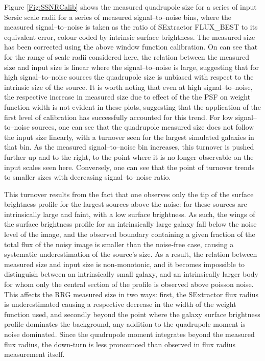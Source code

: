 \documentclass[useAMS,usenatbib,times,letter,amssymb]{mn2e}
\begin{document}
Figure \ref{Fig:SSNRCalib} shows the measured quadrupole size for a series of input Sersic scale radii for a series of measured signal--to--noise bins, where the measured signal--to--noise is taken as the ratio of SExtractor FLUX\_BEST to its equivalent error, colour coded by intrinsic surface brightness. The measured size has been corrected using the above window function calibration. On can see that for the range of scale radii considered here, the relation between the measured size and input size is linear where the signal--to--noise is large, suggesting that for high signal--to--noise sources the quadrupole size is unbiased with respect to the intrinsic size of the source. It is worth noting that even at high signal--to--noise, the respective increase in measured size due to effect of the the PSF on weight function width is not evident in these plots, suggesting that the application of the first level of calibration has successfully accounted for this trend. For low signal--to--noise sources, one can see that the quadrupole measured size does not follow the input size linearly, with a turnover seen for the largest simulated galaxies in that bin. As the measured signal--to--noise bin increases, this turnover is pushed further up and to the right, to the point where it is no longer observable on the input scales seen here. Conversely, one can see that the point of turnover trends to smaller sizes with decreasing signal--to--noise ratio. 

This turnover results from the fact that one observes only the tip of the surface brightness profile for the largest sources above the noise: for these sources are intrinsically large and faint, with a low surface brightness. As such, the wings of the surface brightness profile for an intrinsically large galaxy fall below the noise level of the image, and the observed boundary containing a given fraction of the total flux of the noisy image is smaller than the noise-free case, causing a systematic underestimation of the source's size. As a result, the relation between measured size and input size is non-monotonic, and it becomes impossible to distinguish between an intrinsically small galaxy, and an intrinsically larger body for whom only the central section of the profile is observed above poisson noise. This affects the RRG measured size in two ways: first, the SExtractor flux radius is underestimated causing a respective decrease in the width of the weight function used, and secondly beyond the point where the galaxy surface brightness profile dominates the background, any addition to the quadrupole moment is noise dominated. Since the quadrupole moment integrates beyond the measured flux radius, the down-turn is less pronounced than observed in flux radius measurement itself.
\end{document}
